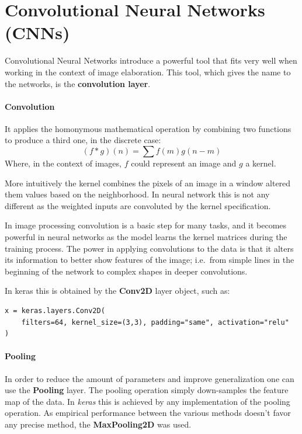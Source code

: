 \newpage


\section{Convolutional Neural Networks (CNNs)}
\label{sec:convolutional-neural-networks-(cnns)}

Convolutional Neural Networks introduce a powerful tool that fits very well when working in the context of image elaboration.
This tool, which gives the name to the networks, is the \textbf{convolution layer}.

\paragraph{Convolution}
It applies the homonymous mathematical operation by combining two functions to produce a third one, in the discrete case:
\[(f\ast g)(n) = \sum f(m)g(n-m)\]
Where, in the context of images, $f$ could represent an image and $g$ a kernel.

More intuitively the kernel combines the pixels of an image in a window altered them values based on the neighborhood.
In neural network this is not any different as the weighted inputs are convoluted by the kernel specification.

In image processing convolution is a basic step for many tasks, and it becomes powerful in neural networks
as the model learns the kernel matrices during the training process.
The power in applying convolutions to the data is that it alters its information to better show features of
the image; i.e.\ from simple lines in the beginning of the network to complex shapes in deeper convolutions.

In keras this is obtained by the \textbf{Conv2D}\cite{con2d} layer object, such as:
\begin{verbatim}
x = keras.layers.Conv2D(
    filters=64, kernel_size=(3,3), padding="same", activation="relu"
)
\end{verbatim}

\paragraph{Pooling}
In order to reduce the amount of parameters and improve generalization one can use the \textbf{Pooling} layer.
The pooling operation simply down-samples the feature map of the data. In \textit{keras} this is achieved by any implementation
of the pooling operation. As empirical performance between the various methods\cite{bieder2021comparison}
doesn't favor any precise method, the \textbf{MaxPooling2D}\cite{maxpooling2d} was used.

